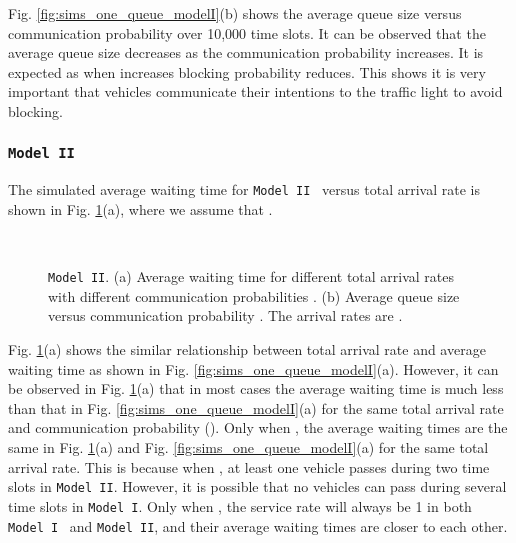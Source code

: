 \documentclass[conference]{IEEEtran}
\newcommand{\modelI}{{\tt{Model I}}}
\newcommand{\modelII}{{\tt{Model II}}}
\begin{document}
Fig. \ref{fig:sims_one_queue_modelI}(b) shows the average queue size versus communication probability  over 10,000 time slots. It can be observed that the average queue size decreases as the communication probability  increases. It is expected as when  increases blocking probability reduces. This shows it is very important that vehicles communicate their intentions to the traffic light to avoid blocking.



\subsubsection{\modelII}
The simulated average waiting time for \modelII~ versus total arrival rate is shown in Fig. \ref{fig:sims_one_queue_modelII}(a), where we assume that .

\begin{figure}[t!]
\vspace{10pt}
\begin{center}
 \\
\end{center}
\begin{center}
\vspace{-5pt}
\caption{\label{fig:sims_one_queue_modelII} \modelII. (a) Average waiting time for different total arrival rates with different communication probabilities . (b) Average queue size versus communication probability . The arrival rates are .}
\vspace{-25pt}
\end{center}
\end{figure}



Fig. \ref{fig:sims_one_queue_modelII}(a) shows the similar relationship between total arrival rate and average waiting time as shown in Fig. \ref{fig:sims_one_queue_modelI}(a). However, it can be observed in Fig. \ref{fig:sims_one_queue_modelII}(a) that in most cases the average waiting time is much less than that in Fig. \ref{fig:sims_one_queue_modelI}(a) for the same total arrival rate and communication probability  (). Only when , the average waiting times are the same in Fig. \ref{fig:sims_one_queue_modelII}(a) and Fig. \ref{fig:sims_one_queue_modelI}(a) for the same total arrival rate. This is because when , at least one vehicle passes during two time slots in \modelII. However, it is possible that no vehicles can pass during several time slots in \modelI. Only when , the service rate will always be 1 in both \modelI~ and \modelII, and their average waiting times are closer to each other. 
\end{document}
